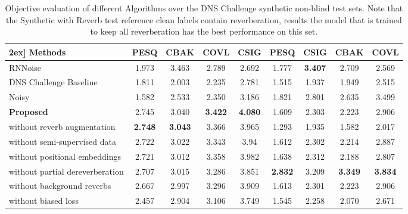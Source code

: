 \documentclass[english]{article}
\begin{document}
\begin{table*}[hbt!]
\vspace{-0.1in}
\footnotesize
\centering
\begin{tabular}{l|cccc|cccc} 
\hline \-2ex]
Methods  &{PESQ} &{CBAK} &{COVL} &{CSIG}  &{PESQ} &{CSIG}  &{CBAK} &{COVL} \\
\hline

RNNoise \cite{valin2018rnnoise} 
& 1.973 & 3.463 & 2.789 & 2.692 & 1.777 & \bf{3.407} & 2.709 & 2.569 \\
DNS Challenge Baseline \cite{dnschallenge}    &
1.811 & 2.003 & 2.235 & 2.781 &
1.515 & 1.937 & 1.949 & 2.515 \\
Noisy & 1.582 & 2.533 & 2.350 & 3.186 & 1.821 & 2.801 & 2.635 & 3.499 \\
\bf{Proposed} & 2.745 & 3.040 & \bf{3.422} & \bf{4.080} & 1.609 & 2.303 & 2.223 & 2.906 \\
\hspace{0.07in}  without reverb augmentation & \bf{2.748} & \bf{3.043} & 3.366 & 3.965 & 1.293& 1.935 & 1.582 & 2.017 \\
\hspace{0.07in}  without semi-supervised data	& 2.722 & 3.022 & 3.343 & 3.94 & 1.612 & 2.302 & 2.214 & 2.887 \\
\hspace{0.07in}  without positional embeddings	& 2.721 & 3.012 & 3.358 & 3.982 & 1.638 & 2.312 & 2.188 & 2.807 \\
\hspace{0.07in}  without partial dereverberation	& 2.707 & 3.015 & 3.286 & 3.851  & \bf{2.832} & 3.209 & \bf{3.349} & \bf{3.834} \\
\hspace{0.07in}  without background reverbs	& 2.667 & 2.997 & 3.296 & 3.909 & 1.613 & 2.301 & 2.223 & 2.906 \\
\hspace{0.07in}  without biased loss & 2.457 & 2.904 & 3.106 & 3.749 & 1.545 & 2.258 & 2.070 & 2.671 \\
\hline 
\end{tabular}
\vspace{0.05in}
\caption{Objective evaluation of different Algorithms over the DNS Challenge synthetic non-blind test sets. Note that the Synthetic with Reverb test reference clean labels contain reverberation, results the model that is trained to keep all reverberation has the best performance on this set. 
}
\label{tableobjectivemetrics}
\vspace{-0.25in}
\end{table*}
\end{document}
